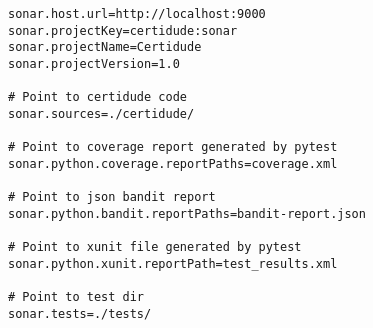 \begin{lstlisting}[frame=single, basicstyle=\tiny]
sonar.host.url=http://localhost:9000
sonar.projectKey=certidude:sonar
sonar.projectName=Certidude
sonar.projectVersion=1.0

# Point to certidude code
sonar.sources=./certidude/

# Point to coverage report generated by pytest
sonar.python.coverage.reportPaths=coverage.xml            

# Point to json bandit report
sonar.python.bandit.reportPaths=bandit-report.json

# Point to xunit file generated by pytest
sonar.python.xunit.reportPath=test_results.xml            

# Point to test dir
sonar.tests=./tests/
\end{lstlisting}